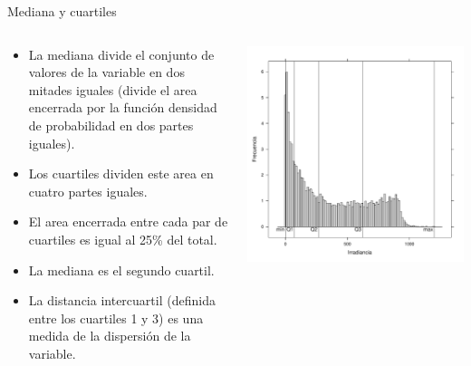 \documentclass[aspectratio=169, usenames,svgnames,dvipsnames]{beamer}
\begin{document}
\begin{frame}[label={sec:orgd25f928}]{Mediana y cuartiles}
\begin{columns}
\begin{column}{0.5\columnwidth}
\begin{itemize}
\item La \alert{mediana} divide el conjunto de valores de la variable en \alert{dos
mitades} iguales (divide el area encerrada por la función densidad
de probabilidad en dos partes iguales).
\item Los \alert{cuartiles} dividen este area en \alert{cuatro} partes iguales.
\item El area encerrada entre cada par de cuartiles es igual al 25\% del total.
\item La \alert{mediana} es el \alert{segundo cuartil}.
\item La \alert{distancia intercuartil} (definida entre los cuartiles 1 y 3) es
una \alert{medida de la dispersión} de la variable.
\end{itemize}
\end{column}

\begin{column}{0.5\columnwidth}
\begin{center}
\includegraphics[height=0.9\textheight]{../figs/cuantiles.pdf}
\end{center}
\end{column}
\end{columns}
\end{frame}
\end{document}
